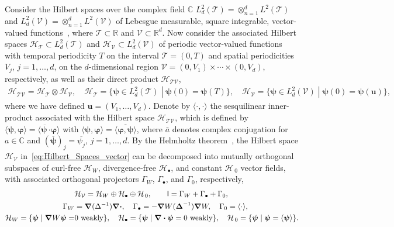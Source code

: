 \documentclass[leqno,onefignum,onetabnum]{siamltex1213}
\newcommand{\Tc}{\mathcal{T}}
\newcommand{\Vc}{\mathcal{V}}
\newcommand{\Hc}{\mathcal{H}}
\newcommand{\Ib}{\mathsf{I}}
\newcommand\bDelta{\mbox{\boldmath${\Delta}$}}
\newcommand\bnabla{\mbox{\boldmath${\nabla}$}}
\providecommand\bcdot{\boldsymbol{\cdot}}
\newcommand{\vecu}{\boldsymbol{u}}
\newcommand{\vecpsi}{\boldsymbol{\psi}}
\newcommand{\vecvarphi}{\boldsymbol{\varphi}}
\begin{document}
Consider the Hilbert spaces over the complex field $\mathbb{C}$
$L^2_d(\Tc)=\otimes_{n=1}^dL^2(\Tc)$ and
$L^2_d(\Vc)=\otimes_{n=1}^dL^2(\Vc)$ 
of Lebesgue measurable, square integrable, vector-valued
functions~\cite{Folland:99:RealAnalysis}, where $\Tc\subset\mathbb{R}$ and
$\Vc\subset\mathbb{R}^d$. Now  
consider the associated Hilbert spaces $\Hc_{\Tc}\subset L^2_d(\Tc)$ and
$\Hc_{\Vc}\subset L^2_d(\Vc)$ of periodic vector-valued functions with
temporal periodicity $T$ on the interval $\Tc=(0,T)$ and spatial
periodicities $V_j$, $j=1,\ldots,d$, on the $d$-dimensional region
$\Vc=(0,V_1)\times\cdots\times(0,V_d)$, respectively, as well as their direct product 
$\Hc_{\Tc\Vc}$,
%
\begin{align}%
  \Hc_{\Tc\Vc}=\Hc_{\Tc}\otimes\Hc_{\Vc}, \quad
  \Hc_{\Tc}=\{ 
     \vecpsi\in L^2_d(\Tc)\;|\;
     \vecpsi(0)=\vecpsi(T) 
                        \}, \quad
  \Hc_{\Vc}=\{ 
     \vecpsi\in L^2_d(\Vc)\;|\;
     \vecpsi(0)=\vecpsi(\vecu ) 
                        \}, 
\end{align}
%
where we have defined $\vecu =(V_1,\ldots,V_d)$. Denote by $\langle\cdot,\cdot\rangle$ the
sesquilinear inner-product associated with the Hilbert space
$\Hc_{\Tc\Vc}$, which is defined by
$\langle\vecpsi,\vecvarphi\rangle=\langle\overline{\vecpsi\,}\bcdot\vecvarphi\rangle$  with 
$\langle\vecpsi,\vecvarphi\rangle=\overline{\langle\vecvarphi,\vecpsi\rangle}$, where $\bar{a}$ 
denotes complex conjugation for $a\in\mathbb{C}$ and
$(\overline{\vecpsi})_j=\overline{\psi_j}$, $j=1,\ldots,d$. By the Helmholtz
theorem~\cite{Denaro:2003:0271,Bhatia:IEE:1077}, the Hilbert space
$\Hc_{\Vc}$ in~\eqref{eq:Hilbert_Spaces_vector} can be decomposed into
mutually orthogonal subspaces of curl-free $\Hc_W$, divergence-free
$\Hc_\bullet$, and constant $\Hc_{\,0}$ vector fields, with associated
orthogonal projectors $\Gamma_W$, $\Gamma_\bullet$, and $\Gamma_0$,
respectively,~\cite{Fannjiang:1994:SIAM_JAM:333,MILTON:2002:TC}    
%
\begin{align}%
  &\Hc_{\Vc}=\Hc_W\oplus\Hc_\bullet\oplus\Hc_{\,0},\qquad
  \Ib=\Gamma_W+\Gamma_\bullet+\Gamma_0, \\
  \Gamma_W&=\bnabla (\Delta^{-1})\bnabla \bcdot, \quad
  \Gamma_\bullet=-\bnabla W(\bDelta^{-1})\bnabla W, \quad
  \Gamma_0=\langle\cdot\rangle, \quad
  \notag \\
  \Hc_W=\{\vecpsi\;|\;\bnabla W\vecpsi=&0 \text{ weakly}\}, \quad
  \Hc_\bullet
      =\{\vecpsi\;|\;\bnabla \bcdot\vecpsi=0 \text{ weakly}\},   \quad
  \Hc_{\,0}
      =\{\vecpsi\;|\;\vecpsi=\langle\vecpsi\rangle\}.
     \notag  
\end{align}
%
\end{document}

